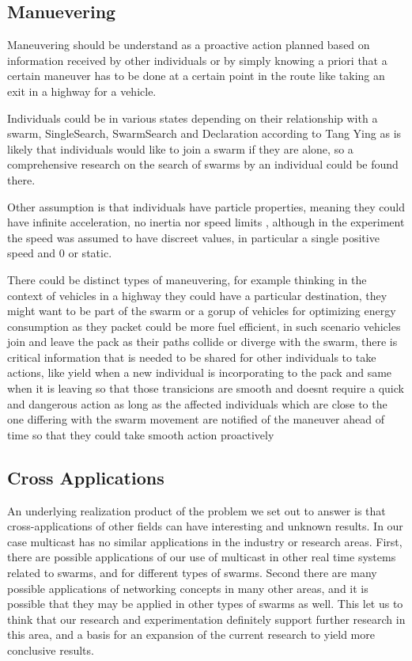 \documentclass[journal]{IEEEtran}
\begin{document}
\subsection{Manuevering}
Maneuvering should be understand as a proactive action planned based on information received by other individuals or by simply knowing a priori that a certain maneuver has to be done at a certain point in the route like taking an exit in a highway for a vehicle.

Individuals could be in various states depending on their relationship with a swarm, SingleSearch, SwarmSearch and Declaration according to Tang Ying \cite{HH4} as is likely that individuals would like to join a swarm if they are alone, so a comprehensive research on the search of swarms by an individual could be found there.

Other assumption is that individuals have particle properties, meaning they could have infinite acceleration, no inertia nor speed limits \cite{HH4}, although in the experiment the speed was assumed to have discreet values, in particular a single positive speed and 0 or static.

There could be distinct types of maneuvering, for example thinking in the context of vehicles in a highway they could have a particular destination, they might want to be part of the swarm or a gorup of vehicles for optimizing energy consumption as they packet could be more fuel efficient, in such scenario vehicles join and leave the pack as their paths collide or diverge with the swarm, there is critical information that is needed to be shared for other individuals to take actions, like yield when a new individual is incorporating to the pack and same when it is leaving so that those transicions are smooth and doesnt require a quick and dangerous action as long as the affected individuals which are close to the one differing with the swarm movement are notified of the maneuver ahead of time so that they could take smooth action proactively

\subsection{Cross Applications}
An underlying realization product of the problem we set out to answer is that cross-applications of other fields can have interesting and unknown results. In our case multicast has no similar applications in the industry or research areas. First, there are possible applications of our use of multicast in other real time systems related to swarms, and for different types of swarms. Second there are many possible applications of networking concepts in many other areas, and it is possible that they may be applied in other types of swarms as well. 
This let us to think that our research and experimentation definitely support further research in this area, and a basis for an expansion of the current research to yield more conclusive results. 
\end{document}
